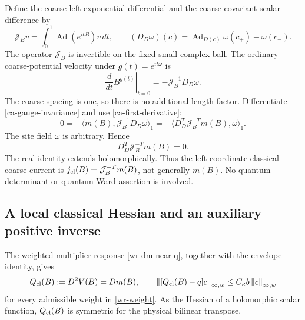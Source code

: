 \documentclass[11pt]{article}
\theoremstyle{remark}
\newcommand{\norm}[1]{\left\|#1\right\|}
\begin{document}
Define the coarse left exponential differential and the
coarse covariant scalar difference by
\begin{equation}\label{ca-left-differential}
 \mathcal J_Bv=\int_0^1\operatorname{Ad}(e^{itB})v\,dt,
 \qquad
 (D_D\omega)(c)=\operatorname{Ad}_{D(c)}\omega(c_+)-\omega(c_-).
\end{equation}
The operator $\mathcal J_B$ is invertible on the fixed small
complex ball. The ordinary coarse-potential velocity under
$g(t)=e^{it\omega}$ is
\begin{equation}\label{ca-gauge-velocity}
 \left.\frac{d}{dt}B^{g(t)}\right|_{t=0}
             =-\mathcal J_B^{-1}D_D\omega.
\end{equation}
The coarse spacing is one, so there is no additional length
factor. Differentiate \eqref{ca-gauge-invariance} and use
\eqref{ca-first-derivative}:
\[
 0=-\langle m(B),\mathcal J_B^{-1}D_D\omega\rangle_1
   =-\langle D_D^T\mathcal J_B^{-T}m(B),\omega\rangle_1.
\]
The site field $\omega$ is arbitrary. Hence
\begin{equation}\label{ca-ward}
 \boxed{\qquad D_D^T\mathcal J_B^{-T}m(B)=0.\qquad}
\end{equation}
The real identity extends holomorphically. Thus the
left-coordinate classical coarse current is
$j_{\rm cl}(B)=\mathcal J_B^{-T}m(B)$, not generally $m(B)$.
No quantum determinant or quantum Ward assertion is involved.

\subsection{A local classical Hessian and an auxiliary positive inverse}
\label{ca-precision-section}

The weighted multiplier response \eqref{wr-dm-near-q}, together
with the envelope identity, gives
\begin{equation}\label{ca-hessian-weighted}
 Q_{\rm cl}(B):=D^2V(B)=Dm(B),\qquad
 \norm{[Q_{\rm cl}(B)-q]c}_{\infty,w}
       \le C_\kappa b\norm c_{\infty,w}
\end{equation}
for every admissible weight in \eqref{wr-weight}. As the
Hessian of a holomorphic scalar function, $Q_{\rm cl}(B)$
is symmetric for the physical bilinear transpose.
\end{document}
